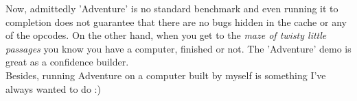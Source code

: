     Now, admittedly 'Adventure' is no standard benchmark and even running it to 
    completion does not guarantee that there are no bugs hidden in the cache or 
    any of the opcodes.
    On the other hand, when you get to the \emph{maze of twisty little passages} 
    you know you have a computer, finished or not. The 'Adventure' demo is 
    great as a confidence builder.\\
    
    Besides, running Adventure on a computer built by myself is something 
    I've always wanted to do :)\\
